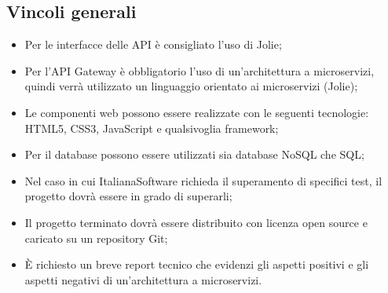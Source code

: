\subsection{Vincoli generali}
\begin{itemize}
\item Per le interfacce delle API è consigliato l'uso di Jolie;
\item Per l'API Gateway è obbligatorio l'uso di un'architettura a microservizi, quindi verrà utilizzato un linguaggio orientato ai microservizi (Jolie);
\item Le componenti web possono essere realizzate con le seguenti tecnologie: HTML5, CSS3, JavaScript e qualsivoglia framework;
\item Per il database possono essere utilizzati sia database NoSQL che SQL;
\item Nel caso in cui ItalianaSoftware richieda il superamento di specifici test, il progetto dovrà essere in grado di superarli;
\item Il progetto terminato dovrà essere distribuito con licenza open source e caricato su un repository Git;
\item \MakeUppercase{è} richiesto un breve report tecnico che evidenzi gli aspetti positivi e gli aspetti negativi di un'architettura a microservizi.
\end{itemize}
